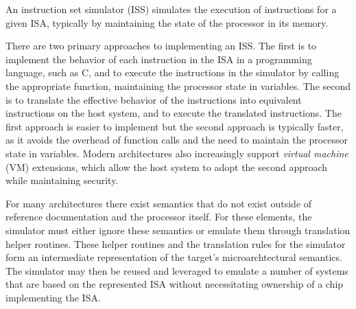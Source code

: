 An instruction set simulator (ISS) simulates the execution of instructions for a given ISA, typically by maintaining the state of the processor in its memory.

There are two primary approaches to implementing an ISS.
The first is to implement the behavior of each instruction in the ISA in a programming language, such as C, and to execute the instructions in the simulator by calling the appropriate function, maintaining the processor state in variables.
The second is to translate the effective behavior of the instructions into equivalent instructions on the host system, and to execute the translated instructions.
The first approach is easier to implement but the second approach is typically faster, as it avoids the overhead of function calls and the need to maintain the processor state in variables.
Modern architectures also increasingly support \emph{virtual machine} (VM) extensions, which allow the host system to adopt the second approach while maintaining security.

For many architectures there exist semantics that do not exist outside of reference documentation and the processor itself.
For these elements, the simulator must either ignore these semantics or emulate them through translation helper routines.
These helper routines and the translation rules for the simulator form an intermediate representation of the target's microarchtectural semantics.
The simulator may then be reused and leveraged to emulate a number of systems that are based on the represented ISA without necessitating ownership of a chip implementing the ISA.

